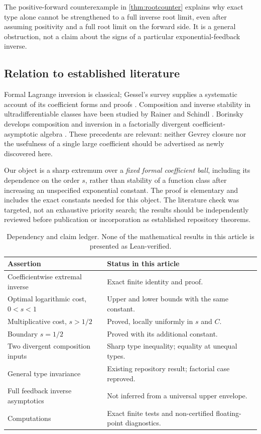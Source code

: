 \documentclass[11pt,a4paper]{article}
\theoremstyle{definition}
\theoremstyle{remark}
\numberwithin{equation}{section}
\begin{document}
The positive-forward counterexample in \cref{thm:rootcounter} explains
why exact type alone cannot be strengthened to a full inverse root limit,
even after assuming positivity and a full root limit on the forward
side. It is a general obstruction, not a claim about the signs of a
particular exponential-feedback inverse.

\subsection{Relation to established literature}
Formal Lagrange inversion is classical; Gessel's survey supplies a
systematic account of its coefficient forms and proofs \cite{gessel}.
Composition and inverse stability in ultradifferentiable classes have
been studied by Rainer and Schindl \cite{rscomposition,rsstability}.
Borinsky develops composition and inversion in a factorially divergent
coefficient-asymptotic algebra \cite{borinsky}. These precedents are
relevant: neither Gevrey closure nor the usefulness of a single large
coefficient should be advertised as newly discovered here.

Our object is a sharp extremum over a \emph{fixed formal coefficient
ball}, including its dependence on the order $s$, rather than stability
of a function class after increasing an unspecified exponential constant.
The proof is elementary and includes the exact constants needed for this
object. The literature check was targeted, not an exhaustive priority
search; the results should be independently reviewed before publication
or incorporation as established repository theorems.

\begin{table}[htbp]
\centering\small
\begin{tabular}{p{}p{}}
\toprule
Assertion & Status in this article\\
\midrule
Coefficientwise extremal inverse & Exact finite identity and proof.\\
Optimal logarithmic cost, $0<s<1$ & Upper and lower bounds with the same constant.\\
Multiplicative cost, $s>1/2$ & Proved, locally uniformly in $s$ and $C$.\\
Boundary $s=1/2$ & Proved with its additional constant.\\
Two divergent composition inputs & Sharp type inequality; equality at unequal types.\\
General type invariance & Existing repository result; factorial case reproved.\\
Full feedback inverse asymptotics & Not inferred from a universal upper envelope.\\
Computations & Exact finite tests and non-certified floating-point diagnostics.\\
\bottomrule
\end{tabular}
\caption{Dependency and claim ledger. None of the mathematical results in this article is presented as Lean-verified.}
\end{table}
\end{document}
